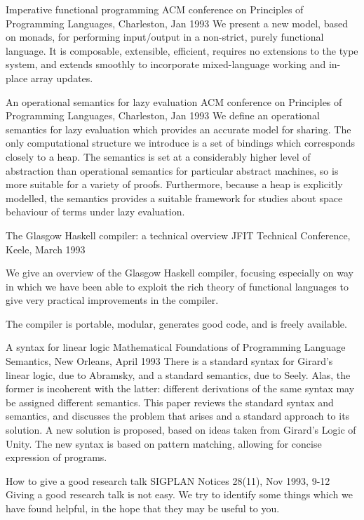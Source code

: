 {Imperative functional programming}
{ACM conference on Principles of Programming Languages, Charleston, Jan 1993}
{We present a new model, based on monads, for performing input/output
in a non-strict, purely functional language.  It
is composable, extensible, efficient, requires no extensions
to the type system, and extends smoothly to incorporate mixed-language
working and in-place array updates.
}

{An operational semantics for lazy evaluation}
{ACM conference on Principles of Programming Languages, Charleston, Jan 1993}
{We define an operational semantics for lazy evaluation which provides
an accurate model for sharing. The only computational structure
we introduce is a set of bindings which corresponds closely to a
heap. The semantics is set at a considerably higher level of abstraction
than operational semantics for particular abstract machines, so is
more suitable for a variety of proofs. Furthermore, because a heap
is explicitly modelled, the semantics provides a suitable framework
for studies about space behaviour of terms under lazy evaluation.
}

{The Glasgow Haskell compiler: a technical overview}
{JFIT Technical Conference, Keele, March 1993}
{We give an overview of the Glasgow Haskell compiler,
focusing especially on way in which we have been able
to exploit the rich theory of functional languages to give
very practical improvements in the compiler.

The compiler is portable, modular, generates good code, and is 
freely available.
}

{A syntax for linear logic}
{Mathematical Foundations of 
Programming Language Semantics, New Orleans, April 1993}
{There is a standard syntax for Girard's linear logic, due
to Abramsky, and a standard semantics, due to Seely.  Alas, the
former is incoherent with the latter: different derivations of
the same syntax may be assigned different semantics.  This paper
reviews the standard syntax and semantics, and discusses the problem
that arises and a standard approach to its solution.  A new solution
is proposed, based on ideas taken from Girard's Logic of Unity.
The new syntax is based on pattern matching, allowing for concise
expression of programs.}

{How to give a good research talk}
{SIGPLAN Notices 28(11), Nov 1993, 9-12}
{
Giving a good research talk is not easy. We try to identify some things
which we have found helpful, in the hope that they may be useful to you. 
}


